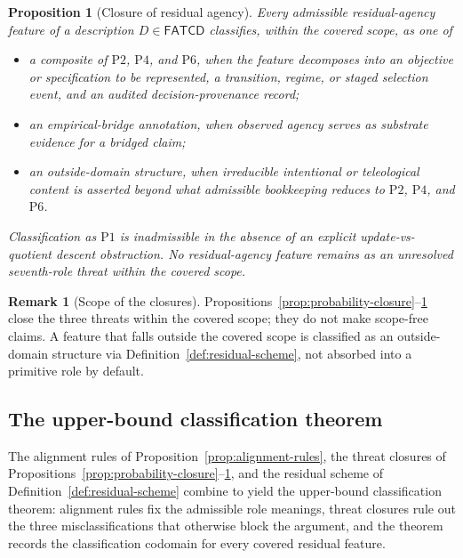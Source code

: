 \documentclass[11pt]{article}
\newtheorem{proposition}[theorem]{Proposition}
\theoremstyle{definition}
\newtheorem{remark}[theorem]{Remark}
\newcommand{\FATCD}{\ensuremath{\mathsf{FATCD}}}
\newcommand{\Pone}{\ensuremath{\mathrm{P1}}}
\newcommand{\Ptwo}{\ensuremath{\mathrm{P2}}}
\newcommand{\Pfour}{\ensuremath{\mathrm{P4}}}
\newcommand{\Psix}{\ensuremath{\mathrm{P6}}}
\begin{document}
\begin{proposition}[Closure of residual agency]\label{prop:agency-closure}
Every admissible residual-agency feature of a description
\(D \in \FATCD{}\) classifies, within the covered scope, as one of
\begin{itemize}[topsep=2pt,itemsep=1pt]
  \item a composite of \Ptwo{}, \Pfour{}, and \Psix{}, when the feature
    decomposes into an objective or specification to be represented, a
    transition, regime, or staged selection event, and an audited
    decision-provenance record;
  \item an empirical-bridge annotation, when observed agency serves as
    substrate evidence for a bridged claim;
  \item an outside-domain structure, when irreducible intentional or
    teleological content is asserted beyond what admissible
    bookkeeping reduces to \Ptwo{}, \Pfour{}, and \Psix{}.
\end{itemize}
Classification as \Pone{} is inadmissible in the absence of an explicit
update-vs-quotient descent obstruction. No residual-agency feature remains
as an unresolved seventh-role threat within the covered scope.
\end{proposition}

\begin{remark}[Scope of the closures]\label{rem:threat-closures-scope}
Propositions~\ref{prop:probability-closure}--\ref{prop:agency-closure}
close the three threats within the covered scope; they do not make
scope-free claims. A feature that falls outside the covered scope is
classified as an outside-domain structure via
Definition~\ref{def:residual-scheme}, not absorbed into a primitive role
by default.
\end{remark}

\subsection{The upper-bound classification theorem}\label{subsec:classification-theorem}

The alignment rules of Proposition~\ref{prop:alignment-rules}, the
threat closures of
Propositions~\ref{prop:probability-closure}--\ref{prop:agency-closure},
and the residual scheme of Definition~\ref{def:residual-scheme}
combine to yield the upper-bound classification theorem: alignment
rules fix the admissible role meanings, threat closures rule out the
three misclassifications that otherwise block the argument, and the
theorem records the classification codomain for every covered
residual feature.
\end{document}
